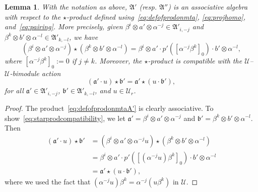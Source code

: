 \documentclass[12pt,a4paper,reqno]{amsart}
\numberwithin{equation}{section}
\newtheorem{lemma}[theorem]{Lemma}
\theoremstyle{definition}
\def \al{\alpha}
\def \b{\beta}
\def\o{\otimes}
\def\scrU{\mathscr{U}}
\def\fA{\mathfrak{A}}
\def\fa{\mathfrak{a}}
\def\fb{\mathfrak{b}}
\begin{document}
\begin{lemma}
With the notation as above, $\fA'$ (resp. $\fA''$) is an associative algebra with respect to the $\star$-product defined using~\eqref{eq:defofprodonmta}, \eqref{eq:projhomo}, and~\eqref{eq:pairing}. More precisely, given $\b^i\o a'\o \al^{-j}\in \fA'_{i,-j}$ and $\b^k\o b'\o \al^{-l}\in \fA'_{k,-l}$, we have
\begin{equation}\label{eq:defofprodonmtaA'}
				\left(\b^i\o a'\o \al^{-j}\right) \star \left(\b^k\o b'\o \al^{-l}\right)= \b^i\o a'\cdot p'([\al^{-j}\b^k]_0)\cdot b'\o \al^{-l},
			\end{equation}
where $[\al^{-j}\b^k]_0:=0$ if $j\neq k$.
Moreover, the $\star$-product is compatible with the $\scrU$--$\scrU$-bimodule action
\begin{equation}\label{eq:starprodcompatibility}
    (\fa'\cdot u)\star\fb'=\fa'\star(u\cdot \fb'),
\end{equation}
for all $\fa'\in \fA'_{i,-j}$, $\fb'\in \fA'_{k,-l}$, and $u\in \scrU_r$.
\end{lemma}
\begin{proof}
The product~\eqref{eq:defofprodonmtaA'} is clearly associative. To show~\eqref{eq:starprodcompatibility}, we let $\fa'=\b^i\o a'\o \al^{-j}$ and $\fb'=\b^k\o b'\o \al^{-l}$. Then
\begin{align*}
(\fa'\cdot u)\star\fb'&=\left(\b^i\o a'\o \al^{-j}u\right)\star \left(\b^k\o b'\o \al^{-l}\right)\\
&=\b^i\o a'\cdot p'([(\al^{-j}u)\b^k]_0)\cdot b'\o \al^{-l}\\
&=\fa'\star(u\cdot \fb'),
\end{align*}
where we used the fact that $(\al^{-j}u)\b^k=\al^{-j}(u\b^k)$ in $\scrU$.
\end{proof}
\end{document}

